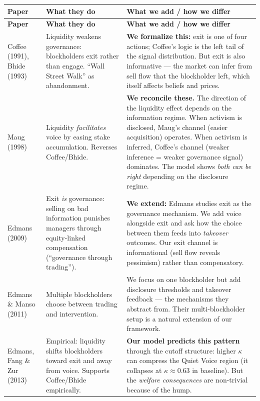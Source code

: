 \documentclass[9pt,a4paper]{extarticle}
\newcommand{\say}[1]{\textbf{#1}}
\begin{document}
{\footnotesize
\begin{longtable}{@{}P{0.20\textwidth}P{0.32\textwidth}P{0.42\textwidth}@{}}
\toprule
\textbf{Paper} & \textbf{What they do} & \textbf{What we add / how we differ} \\
\midrule
\endfirsthead
\toprule
\textbf{Paper} & \textbf{What they do} & \textbf{What we add / how we differ} \\
\midrule
\endhead

Coffee (1991), Bhide (1993) &
Liquidity weakens governance: blockholders exit rather than engage. ``Wall Street Walk'' as abandonment. &
\say{We formalize this:} exit is one of four actions; Coffee's logic is the left tail of the signal distribution. But exit is also informative --- the market can infer from sell flow that the blockholder left, which itself affects beliefs and prices. \\

Maug (1998) &
Liquidity \emph{facilitates} voice by easing stake accumulation. Reverses Coffee/Bhide. &
\say{We reconcile these.} The direction of the liquidity effect depends on the information regime. When activism is disclosed, Maug's channel (easier acquisition) operates. When activism is inferred, Coffee's channel (weaker inference = weaker governance signal) dominates. The model shows \emph{both can be right} depending on the disclosure regime. \\

Edmans (2009) &
Exit \emph{is} governance: selling on bad information punishes managers through equity-linked compensation (``governance through trading''). &
\say{We extend:} Edmans studies exit as the governance mechanism. We add voice alongside exit and ask how the choice between them feeds into \emph{takeover} outcomes. Our exit channel is informational (sell flow reveals pessimism) rather than compensatory. \\

Edmans \& Manso (2011) &
Multiple blockholders choose between trading and intervention. &
We focus on one blockholder but add disclosure thresholds and takeover feedback --- the mechanisms they abstract from. Their multi-blockholder setup is a natural extension of our framework. \\

Edmans, Fang \& Zur (2013) &
Empirical: liquidity shifts blockholders toward exit and away from voice. Supports Coffee/Bhide empirically. &
\say{Our model predicts this pattern} through the cutoff structure: higher $\kappa$ can compress the Quiet Voice region (it collapses at $\kappa\approx 0.63$ in baseline). But the \emph{welfare consequences} are non-trivial because of the hump. \\
\bottomrule
\end{longtable}
}
\end{document}
